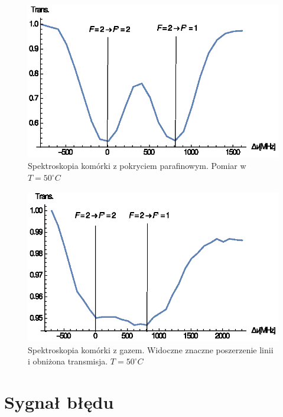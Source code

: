 \documentclass[a4paper,10pt,twoside]{report}
\begin{document}
\begin{figure}[h!]
\centering
 \includegraphics[width=\textwidth]{spek_para.eps}
 \caption{Spektroskopia komórki z pokryciem parafinowym. Pomiar w $T=50^{\circ}C$}
 \label{fig:spekpara}
\end{figure}



\begin{figure}[h!]
\centering
 \includegraphics[width=\textwidth]{spek_gaz.eps}
 \caption{Spektroskopia komórki z gazem. Widoczne znaczne poszerzenie linii i obniżona transmisja. $T=50^{\circ}C$}
 \label{fig:spekgaz}
\end{figure}


\section{Sygnał błędu}
\end{document}
